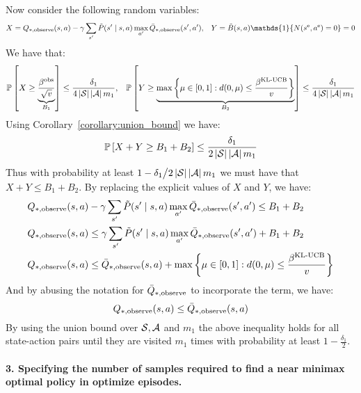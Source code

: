 Now consider the following random variables:
%
\begin{align*}
    X =  Q_{*, \text{observe}}(s, a) - \gamma \sum_{s'}\estimate{P}(s' \mid s, a)\max_{a'}\model{Q}_{*, \text{observe}}(s', a') , && Y = \estimate{B}(s, a)\mathds{1}\{N(\env{s}, \env{a}) = 0\} = 0
\end{align*}
%
We have that:
%
\begin{align*}
    \mathbb{P}\left[ {X \geq \underbrace{\frac{\beta^{\text{obs}}}{\sqrt{v}}}_{B_1}} \right] \leq \frac{\delta_1}{4\left \lvert \mathcal{S} \right \rvert\left \lvert \mathcal{A} \right \rvert m_1}, && \mathbb{P}\left[ {Y \geq \underbrace{\max \left\{\mu \in [0, 1]: d(0, \mu) \leq \frac{\beta^{\text{KL-UCB}}}{v}\right\}}_{B_2}} \right] \leq \frac{\delta_1}{4\left \lvert \mathcal{S} \right \rvert\left \lvert \mathcal{A} \right \rvert m_1}
\end{align*}
%
Using Corollary~\ref{corollary:union_bound} we have:
%
\begin{equation*}
    \mathbb{P}\left[ {X + Y \geq B_1 + B_2} \right] \leq \frac{\delta_1}{2\left \lvert \mathcal{S} \right \rvert\left \lvert \mathcal{A} \right \rvert m_1}
\end{equation*}
%
Thus with probability at least $1 - {\delta_1} \big/ {2\left \lvert \mathcal{S} \right \rvert\left \lvert \mathcal{A} \right \rvert m_1}$ we must have that $X + Y \leq B_1 + B_2$. By replacing the explicit values of $X$ and $Y$, we have:
%
\begin{align*}
    & Q_{*, \text{observe}}(s, a) - \gamma \sum_{s'}\tilde{P}(s' \mid s, a)\max_{a'}\bar{Q}_{*, \text{observe}}(s', a')  \leq B_1 + B_2 \\
    & Q_{*, \text{observe}}(s, a) \leq \gamma \sum_{s'}\tilde{P}(s' \mid s, a)\max_{a'}\bar{Q}_{*, \text{observe}}(s', a')  + B_1 + B_2 \\
    & Q_{*, \text{observe}}(s, a) \leq \bar{Q}_{*, \text{observe}}(s, a)  + \max \left\{\mu \in [0, 1]: d(0, \mu) \leq \frac{\beta^{\text{KL-UCB}}}{v}\right\}
\end{align*}
%
And by abusing the notation for $\bar{Q}_{*, \text{observe}}$ to incorporate the  term, we have:
%
\begin{equation*}
    Q_{*, \text{observe}}(s, a) \leq \bar{Q}_{*, \text{observe}}(s, a)
\end{equation*}
%
By using the union bound over $\mathcal{S}, \mathcal{A}$ and $m_1$ the above inequality holds for all state-action pairs until they are visited $m_1$ times with probability at least $1 - \frac{\delta_1}{2}$.
%
\paragraph{3. Specifying the number of samples required to find a near minimax optimal policy in optimize episodes.}

